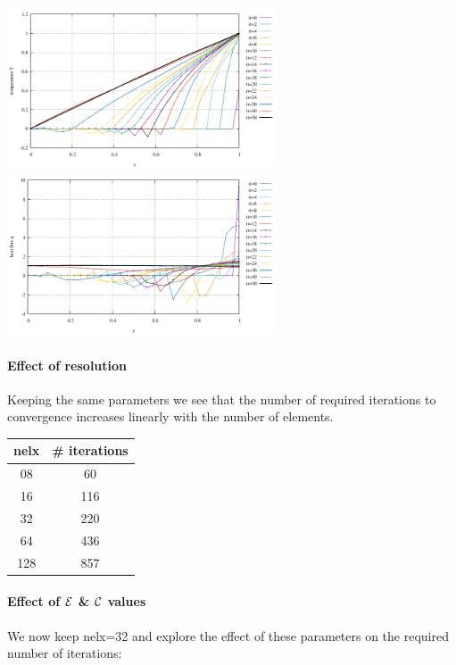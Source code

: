 \begin{center}
\includegraphics[width=8cm]{python_codes/fieldstone_57/results/E04_C000/T_minus_evol.pdf}
\includegraphics[width=8cm]{python_codes/fieldstone_57/results/E04_C000/q_minus_evol.pdf}
\end{center}

\paragraph{Effect of resolution} Keeping the same parameters we see that the 
number of required iterations to convergence increases linearly with the number of elements.

\begin{center}
\begin{tabular}{cc}
\hline
nelx & \# iterations \\
\hline
08 &60  \\
16 &116 \\
32 &220 \\
64 &436 \\
128 & 857 \\
\hline
\end{tabular}
\end{center}

\paragraph{Effect of ${\cal E}$ \& ${\cal C}$ values} 
We now keep nelx=32 and explore the effect of these parameters on the 
required number of iterations:

